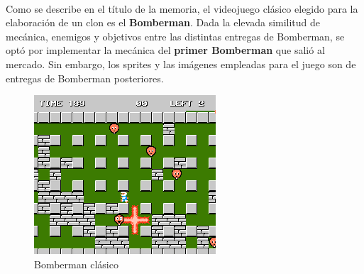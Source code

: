 \documentclass[a4paper]{article}
\begin{document}
\paragraph{}Como se describe en el título de la memoria, el videojuego clásico elegido para la elaboración de un clon es el \textbf{Bomberman}. Dada la elevada similitud de mecánica, enemigos y objetivos entre las distintas entregas de Bomberman, se optó por implementar la mecánica del \textbf{primer Bomberman} que salió al mercado. Sin embargo, los sprites y las imágenes empleadas para el juego son de entregas de Bomberman posteriores.
\vspace*{0.2in}
\begin{figure}[H]
	\centering
	\begin{minipage}[b]{0.4\textwidth}
		\includegraphics[width=\textwidth]{primerBomberman.png}
		\caption{Bomberman clásico}
	\end{minipage}
	\hfill
	\begin{minipage}[b]{0.4\textwidth}

\end{minipage}
\end{figure}
\end{document}
